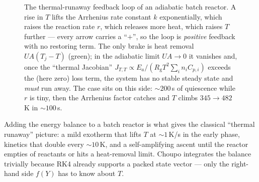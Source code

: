 \documentclass[11pt,a4paper]{article}
\newcommand{\Rgas}{R_{\!\mathrm{g}}}                %
\begin{document}
\begin{figure}[ht]
\centering
{}
\caption{The thermal-runaway feedback loop of an adiabatic batch
reactor.  A rise in $T$ lifts the Arrhenius rate constant $k$
exponentially, which raises the reaction rate $r$, which releases more
heat, which raises $T$ further --- every arrow carries a ``$+$'', so the
loop is \emph{positive} feedback with no restoring term.  The only brake
is heat removal $UA(T_j-T)$ (green); in the adiabatic limit $UA\to0$ it
vanishes and, once the ``thermal Jacobian'' $J_{T,T}\propto E_a/(\Rgas
T^2\sum_i n_iC_{p,i})$ exceeds the (here zero) loss term, the system has
no stable steady state and \emph{must} run away.  The case
 sits on this side: $\sim200$\,s of quiescence
while $r$ is tiny, then the Arrhenius factor catches and $T$ climbs
$345\!\to\!482$\,K in $\sim100$\,s.}
\label{fig:thermal-runaway-loop}
\end{figure}


\begin{whatyoulllearn}
Adding the energy balance to a batch reactor is what gives the
classical ``thermal runaway'' picture: a mild exotherm that lifts
$T$ at $\sim 1$\,K/s in the early phase, kinetics that double every
$\sim 10$\,K, and a self-amplifying ascent until the reactor empties
of reactants or hits a heat-removal limit.  Choupo integrates the
balance trivially because RK4 already supports a packed state
vector --- only the right-hand side $f(Y)$ has to know about $T$.
\end{whatyoulllearn}
\end{document}
